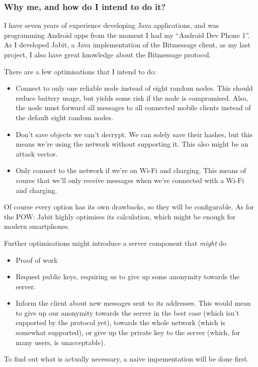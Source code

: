 \documentclass{bfh}
\begin{document}
  \subsubsection{Why me, and how do I intend to do it?}
  I have seven years of experience developing Java applications, and was programming Android apps from the moment I had my ``Android Dev Phone 1''. As I developed Jabit, a Java implementation of the Bitmessage client, as my last project, I also have great knowledge about the Bitmessage protocol.

  There are a few optimisations that I intend to do:
  \begin{itemize}
    \item Connect to only one reliable node instead of eight random nodes. This should reduce battery usage, but yields some risk if the node is compromised. Also, the node must forward all messages to all connected mobile clients instead of the default eight random nodes.
    \item Don't save objects we can't decrypt. We can solely save their hashes, but this means we're using the network without supporting it. This also might be an attack vector.
    \item Only connect to the network if we're on Wi-Fi and charging. This means of course that we'll only receive messages when we're connected with a Wi-Fi and charging.
  \end{itemize}
  Of course every option has its own drawbacks, so they will be configurable. As for the \ac{POW}: Jabit highly optimises its calculation, which might be enough for modern smartphones.

  Further optimisations might introduce a server component that \textit{might} do
  \begin{itemize}
    \item Proof of work
    \item Request public keys, requiring us to give up some anonymity towards the server.
    \item Inform the client about new messages sent to its addresses. This would mean to give up our anonymity towards the server in the best case (which isn't supported by the protocol yet), towards the whole network (which is somewhat supported), or give up the private key to the server (which, for many users, is unacceptable).
  \end{itemize}

  To find out what is actually necessary, a naive impementation will be done first.
\end{document}
